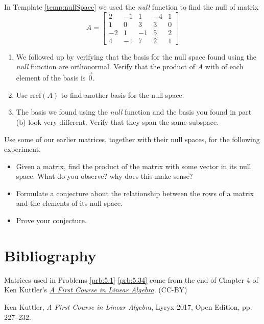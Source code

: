 \documentclass{ximera}
\begin{document}

\begin{problem}\label{prob_oct_Rn1}
    In Template \ref{temp:nullSpace} we used the \emph{null} function to find the null of matrix $$A=\begin{bmatrix}2&-1&1&-4&1\\1&0&3&3&0\\-2&1&-1&5&2\\4&-1&7&2&1\end{bmatrix}$$ 

    \begin{enumerate}
        \item We followed up by verifying that the basis for the null space found using the \emph{null} function are orthonormal.  Verify that the product of $A$ with of each element of the basis is $\vec{0}$.
        \item Use $\text{rref}(A)$ to find another basis for the null space.  
        \item The basis we found using the \emph{null} function and the basis you found in part (b) look very different.  Verify that they span the same subspace.
    \end{enumerate}
\end{problem}

\begin{problem}\label{prob_oct_Rn2}
    Use some of our earlier matrices, together with their null spaces, for the following experiment.
    \begin{itemize}
        \item Given a matrix, find the product of the matrix with some vector in its null space.  What do you observe?  why does this make sense?
        \item Formulate a conjecture about the relationship between the rows of a matrix and the elements of its null space.
        \item Prove your conjecture.
    \end{itemize}
\end{problem}

\section*{Bibliography}
Matrices used in Problems \ref{prb:5.1}-\ref{prb:5.34} come from the end of Chapter 4 of Ken Kuttler's \href{https://open.umn.edu/opentextbooks/textbooks/a-first-course-in-linear-algebra-2017}{\it A First Course in Linear Algebra}. (CC-BY)

Ken Kuttler, {\it  A First Course in Linear Algebra}, Lyryx 2017, Open Edition, pp. 227--232.  
\end{document}

